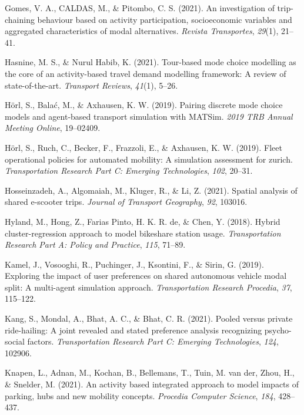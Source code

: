 \documentclass[fancy, masters]{byuthesis}
\newlength{\cslhangindent}
\newlength{\cslentryspacingunit} %
\newenvironment{CSLReferences}[2] %
 {%
  \setlength{\parindent}{0pt}
  \ifodd #1
  \let\oldpar\par
  \def\par{\hangindent=\cslhangindent\oldpar}
  \fi
  \setlength{\parskip}{#2\cslentryspacingunit}
 }%
 {}
\begin{document}
\begin{CSLReferences}{1}{0}
\leavevmode{}%
Gomes, V. A., CALDAS, M., \& Pitombo, C. S. (2021). An investigation of trip-chaining behaviour based on activity participation, socioeconomic variables and aggregated characteristics of modal alternatives. \emph{Revista Transportes}, \emph{29}(1), 21--41.

\leavevmode{}%
Hasnine, M. S., \& Nurul Habib, K. (2021). Tour-based mode choice modelling as the core of an activity-based travel demand modelling framework: A review of state-of-the-art. \emph{Transport Reviews}, \emph{41}(1), 5--26.

\leavevmode{}%
Hörl, S., Balać, M., \& Axhausen, K. W. (2019). Pairing discrete mode choice models and agent-based transport simulation with MATSim. \emph{2019 TRB Annual Meeting Online}, 19--02409.

\leavevmode{}%
Hörl, S., Ruch, C., Becker, F., Frazzoli, E., \& Axhausen, K. W. (2019). Fleet operational policies for automated mobility: A simulation assessment for zurich. \emph{Transportation Research Part C: Emerging Technologies}, \emph{102}, 20--31.

\leavevmode{}%
Hosseinzadeh, A., Algomaiah, M., Kluger, R., \& Li, Z. (2021). Spatial analysis of shared e-scooter trips. \emph{Journal of Transport Geography}, \emph{92}, 103016.

\leavevmode{}%
Hyland, M., Hong, Z., Farias Pinto, H. K. R. de, \& Chen, Y. (2018). Hybrid cluster-regression approach to model bikeshare station usage. \emph{Transportation Research Part A: Policy and Practice}, \emph{115}, 71--89.

\leavevmode{}%
Kamel, J., Vosooghi, R., Puchinger, J., Ksontini, F., \& Sirin, G. (2019). Exploring the impact of user preferences on shared autonomous vehicle modal split: A multi-agent simulation approach. \emph{Transportation Research Procedia}, \emph{37}, 115--122.

\leavevmode{}%
Kang, S., Mondal, A., Bhat, A. C., \& Bhat, C. R. (2021). Pooled versus private ride-hailing: A joint revealed and stated preference analysis recognizing psycho-social factors. \emph{Transportation Research Part C: Emerging Technologies}, \emph{124}, 102906.

\leavevmode{}%
Knapen, L., Adnan, M., Kochan, B., Bellemans, T., Tuin, M. van der, Zhou, H., \& Snelder, M. (2021). An activity based integrated approach to model impacts of parking, hubs and new mobility concepts. \emph{Procedia Computer Science}, \emph{184}, 428--437.


\end{CSLReferences}
\end{document}
